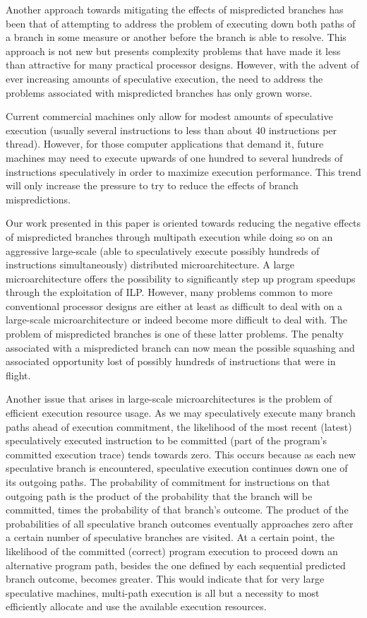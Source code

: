 \documentclass[10pt,dvips]{article}
\begin{document}
Another approach towards mitigating the effects of mispredicted branches
has been that of attempting to address the problem of executing
down both paths of a branch in some measure or another before the
branch is able to resolve.  This approach is not new but presents
complexity problems that have made it less than attractive for
many practical processor designs.  However, with the advent of ever
increasing amounts of speculative execution, the need to address
the problems associated with mispredicted branches has only grown worse.

Current commercial machines only allow for modest
amounts of speculative execution (usually several instructions to 
less than about 40 instructions per thread).
However, for those computer applications that demand it,
future machines may need to execute upwards of one hundred to
several hundreds of instructions speculatively in order to maximize
execution performance.  This trend will only increase the pressure to try
to reduce the effects of branch mispredictions.

Our work presented in this paper is oriented towards reducing the
negative effects of mispredicted branches through multipath execution
while doing so on an aggressive large-scale (able to speculatively execute
possibly hundreds of instructions simultaneously)
distributed
microarchitecture.  
A large microarchitecture offers the
possibility to significantly step up program speedups through 
the exploitation of ILP.
However, many problems common to more conventional processor designs
are either at least as difficult to deal with on a large-scale
microarchitecture or indeed become more difficult to deal with.
The problem of mispredicted branches is one of these latter problems.
The penalty associated with a mispredicted branch can now mean
the possible squashing and associated opportunity lost of possibly
hundreds of instructions that were in flight.  

Another issue that arises in large-scale microarchitectures is the
problem of efficient execution resource usage.
As we may speculatively execute many branch paths ahead of execution
commitment, the likelihood
of the most recent (latest) speculatively executed instruction to
be committed (part of the program's committed execution trace) tends
towards zero.  This occurs because as each new speculative branch is
encountered, speculative execution continues down one of its
outgoing paths.  The probability of commitment for instructions on 
that outgoing
path is the product of the probability that
the branch will be committed, times the probability of that branch's outcome.
The product of the probabilities of all speculative branch outcomes
eventually approaches zero after a certain
number of speculative branches are visited. 
At a certain point, the likelihood of the committed (correct)
program execution to proceed down an alternative program path,
besides the one defined by each sequential predicted branch outcome,
becomes greater.  This would indicate that for very large speculative
machines, multi-path execution is all but a necessity to most
efficiently allocate and use the available execution resources.
\end{document}
